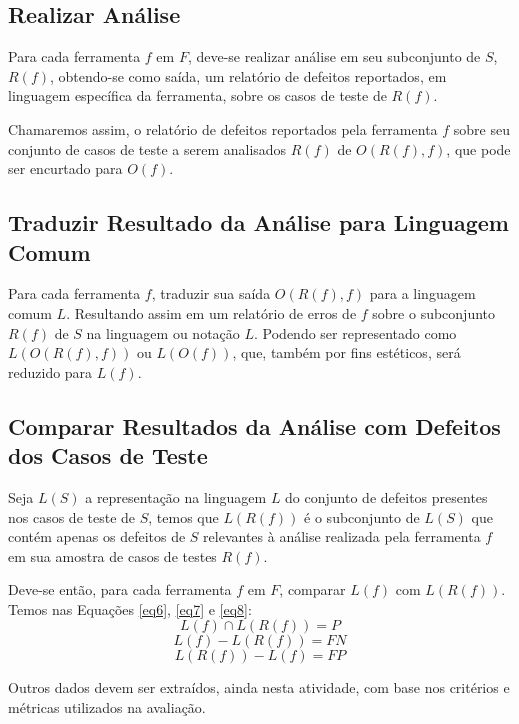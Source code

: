 \subsection{Realizar Análise}

Para cada ferramenta $f$ em $F$, deve-se realizar análise em seu subconjunto de $S$, $R(f)$, obtendo-se como saída, um relatório de defeitos reportados, em linguagem específica da ferramenta, sobre os casos de teste de $R(f)$.

Chamaremos assim, o relatório de defeitos reportados pela ferramenta $f$ sobre seu conjunto de casos de teste a serem analisados $R(f)$ de $O(R(f), f)$, que pode ser encurtado para $O(f)$.

\subsection{Traduzir Resultado da Análise para Linguagem Comum}

Para cada ferramenta $f$, traduzir sua saída $O(R(f), f)$ para a linguagem comum $L$. Resultando assim em um relatório de erros de $f$ sobre o subconjunto $R(f)$ de $S$ na linguagem ou notação $L$. Podendo ser representado como $L(O(R(f), f))$ ou $L(O(f))$, que, também por fins estéticos, será reduzido para $L(f)$.

\subsection{Comparar Resultados da Análise com Defeitos dos Casos de  Teste}

Seja $L(S)$ a representação na linguagem $L$ do conjunto de defeitos presentes nos casos de teste de $S$, temos que $L(R(f))$ é o subconjunto de $L(S)$ que contém apenas os defeitos de $S$ relevantes à análise realizada pela ferramenta $f$ em sua amostra de casos de testes $R(f)$.

Deve-se então, para cada ferramenta $f$ em $F$, comparar $L(f)$ com $L(R(f))$. Temos nas Equações \eqref{eq6}, \eqref{eq7} e \eqref{eq8}:
\begin{equation}\label{eq6}
  L(f) \cap L(R(f)) = P
\end{equation}
\begin{equation}\label{eq7}
  L(f) - L(R(f)) = FN
\end{equation}
\begin{equation}\label{eq8}
  L(R(f)) - L(f) = FP
\end{equation}

Outros dados devem ser extraídos, ainda nesta atividade, com base nos critérios e métricas utilizados na avaliação.

